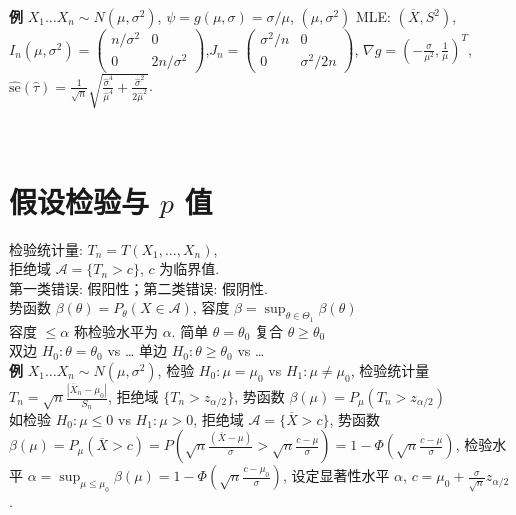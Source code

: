 \documentclass[a4paper, landscape,10pt]{article}
\begin{document}
\begin{multicols}{4}
\begin{scriptsize}
{\bfseries 例} $X_1\dots X_n \sim N(\mu, \sigma^2)$, $\psi = g(\mu, \sigma) = \sigma / \mu$,
$(\mu, \sigma ^ 2)$ MLE: $(\overline X, S^2)$,
$I_n(\mu, \sigma^2) = \begin{pmatrix}
	n / \sigma^2 & 0 \\
	0 & 2n / \sigma^2
\end{pmatrix}$,$J_n = \begin{pmatrix}
	\sigma^2 / n & 0 \\
	0 & \sigma^2 / 2n
\end{pmatrix}$, $\nabla g = (-\frac{\sigma}{\mu^2}, \frac{1}{\mu})^T$,
$\hat {\mathrm{se}}(\hat \tau) = \frac 1 {\sqrt n} \sqrt{\frac {\hat \sigma ^ 4} {\hat \mu^4} + \frac {\hat \sigma^2} {2 \hat \mu^2}}$.
\end{scriptsize} \\
\section{假设检验与 $p$ 值}
\begin{scriptsize}
检验统计量: $T_n = T(X_1, \dots, X_n)$, \\
拒绝域 $\mathcal{A} = \{T_n > c\}$, $c$ 为临界值. \\
第一类错误: 假阳性；第二类错误: 假阴性. \\
势函数 $\beta(\theta) = P_\theta(X\in \mathcal{A})$, 容度 $\beta = \sup_{\theta \in \Theta_1} \beta(\theta)$\\
容度 $\leq \alpha$ 称检验水平为 $\alpha$. 简单 $\theta = \theta_0$ 复合 $\theta \geq \theta_0$ \\
双边 $H_0 : \theta = \theta_0$ vs \dots
单边 $H_0 : \theta \geq \theta_0$ vs \dots\\
{\bfseries 例} $X_1 \dots X_n \sim N(\mu, \sigma^2)$, 检验 $H_0 : \mu = \mu_0$ vs $H_1 : \mu \neq \mu_0$,
检验统计量 $T_n = \sqrt{n} \frac{|\overline X_n - \mu_0|}{S_n}$,
拒绝域 $\{T_n > z_{\alpha/2}\}$,
势函数 $\beta(\mu) = P_\mu(T_n > z_{\alpha/2})$\\
如检验 $H_0: \mu \leq 0$ vs $H_1: \mu > 0$,
拒绝域 $\mathcal{A} = \{\overline X > c\}$,
势函数 $\beta(\mu) = P_\mu(\overline X > c) = P(\sqrt{n}\frac {(\overline X - \mu)} {\sigma} > \sqrt{n} \frac {c - \mu} {\sigma}) = 1 - \Phi(\sqrt{n} \frac {c - \mu} {\sigma})$,
检验水平 $\alpha = \sup_{\mu \leq \mu_0} \beta(\mu) = 1 - \Phi(\sqrt{n} \frac {c - \mu_0} {\sigma})$,
设定显著性水平 $\alpha$, $c=\mu_0 + \frac{\sigma}{\sqrt{n}} z_{\alpha / 2}$. \\
\end{scriptsize}

\end{multicols}
\end{document}
